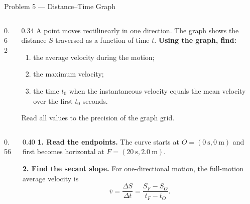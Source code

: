 \begin{frame}{Problem 5 — Distance–Time Graph}
  \vspace{0.15em}
  \begin{columns}[T,onlytextwidth]
    \begin{column}{0.62\textwidth}
      \centering
      \resizebox{\textwidth}{!}{}
    \end{column}
    \begin{column}{0.34\textwidth}
      \scriptsize
      A point moves rectilinearly in one direction. The graph shows the
      distance $S$ traversed as a function of time $t$.
      \vspace{0.45em}
      \textbf{Using the graph, find:}
      \begin{enumerate}
        \item the average velocity during the motion;
        \item the maximum velocity;
        \item the time $t_0$ when the instantaneous velocity equals the mean
          velocity over the first $t_0$ seconds.
      \end{enumerate}
      \vspace{0.25em}
      Read all values to the precision of the graph grid.
    \end{column}
  \end{columns}
\end{frame}

\begin{solutionframe}
  \begin{columns}[T,onlytextwidth]
    \begin{column}{0.56\textwidth}
      \centering
      \begingroup
        \def\showaveragesecant{1}
        \resizebox{\textwidth}{!}{}
      \endgroup
    \end{column}
    \begin{column}{0.40\textwidth}
      \footnotesize
      \textbf{1. Read the endpoints.} The curve starts at
      $O=(\SI{0}{\second},\SI{0}{\metre})$ and first becomes horizontal at
      $F=(\SI{20}{\second},\SI{2.0}{\metre})$.

      \textbf{2. Find the secant slope.} For one-directional motion, the
      full-motion average velocity is
      \[
        \bar v=\frac{\Delta S}{\Delta t}
        =\frac{S_F-S_O}{t_F-t_O}.
      \]
    \end{column}
  \end{columns}
\end{solutionframe}

